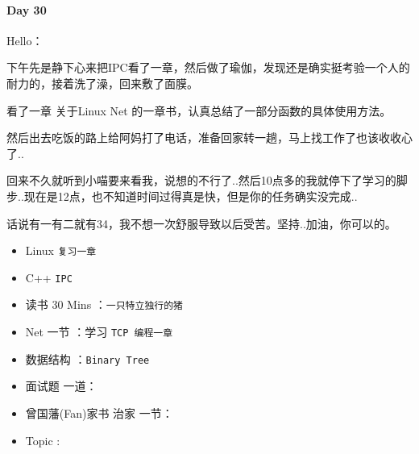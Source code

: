\documentclass[UTF8,a4paper,8pt]{ctexart}
\begin{document}
 	 \paragraph{Day 30      \quad     }
	 	 Hello：
	 	 
	 	 下午先是静下心来把IPC看了一章，然后做了瑜伽，发现还是确实挺考验一个人的耐力的，接着洗了澡，回来敷了面膜。
	 	 
	 	 看了一章 关于Linux Net  的一章书，认真总结了一部分函数的具体使用方法。
	 	 
	 	 然后出去吃饭的路上给阿妈打了电话，准备回家转一趟，马上找工作了也该收收心了..
	 	 
	 	 回来不久就听到小喵要来看我，说想的不行了..然后10点多的我就停下了学习的脚步..现在是12点，也不知道时间过得真是快，但是你的任务确实没完成..
	 	 
	 	 话说有一有二就有34，我不想一次舒服导致以后受苦。坚持..加油，你可以的。
	 	 \begin{itemize}[itemindent = 1em]
	 	 	\renewcommand\labelitemi{\makebox[0pt][l]{$\square$}\hspace{1em}} 
	 	 	\renewcommand\labelitemi{\makebox[0pt][l]{$\square$}\raisebox{.15ex}{\hspace{0.1em}$\checkmark$}}	 	
	 	 	\item   Linux \verb|复习一章|
	 	 	\item   C++   \verb|IPC|
	 	 	
	 	 	\item   读书  30 Mins	：\verb|一只特立独行的猪|
	 	 	\item   Net 一节 ：学习 \verb|TCP 编程一章|	
	 	 	
	 	 	\renewcommand\labelitemi{\makebox[0pt][l]{$\square$}\hspace{1em}} 
	 	 	\item   数据结构 ：\verb|Binary Tree| 
	 	 	\item   面试题 一道：
	 	 	
	 	 	\renewcommand\labelitemi{\makebox[0pt][l]{$\square$}\raisebox{.15ex}{\hspace{0.1em}$\checkmark$}}
	 	 	\item   曾国藩(Fan)家书 治家 一节：
	 	 	\item   Topic :
	 	 \end{itemize}
\end{document}
